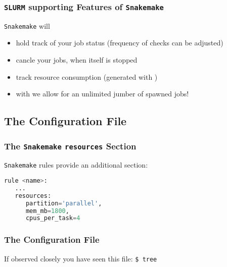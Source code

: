 \begin{frame}[fragile]
  \frametitle{\texttt{SLURM} supporting Features of \texttt{Snakemake}}
  \texttt{Snakemake} will
  \begin{itemize}[<+->]
   \item hold track of your job status (frequency of checks can be adjusted)
   \item cancle your jobs, when itself is stopped
   \item track resource consumption (generated with )
   \item with  we allow for an unlimited jumber of spawned jobs!
  \end{itemize}
  \pause
\end{frame}

\subsection{The Configuration File}

\begin{frame}[fragile]
  \frametitle{The \texttt{Snakemake} \texttt{resources} Section}
  \texttt{Snakemake} rules provide an additional  section:
  \begin{lstlisting}[language=Python,style=Python]
rule <name>:
   ...
   resources:
      partition='parallel',
      mem_mb=1800,
      cpus_per_task=4
  \end{lstlisting}
  \pause
\end{frame}

\begin{frame}
  \frametitle{The Configuration File}
  If observed closely you have seen this file:\newline
            {\tiny \DTsetlength{0.2em}{1em}{0.2em}{0.4pt}{.6pt}
\texttt{\$ tree}
}
 \pause
\end{frame}

